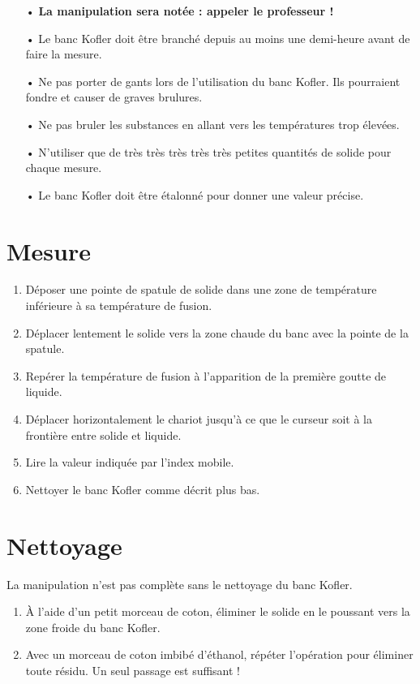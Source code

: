 \begin{itemize}
\item[•] \textbf{La manipulation sera notée : appeler le professeur !}
\item[•] Le banc Kofler doit être branché depuis au moins une demi-heure avant de faire la mesure.
\item[•] Ne pas porter de gants lors de l'utilisation du banc Kofler.
Ils pourraient fondre et causer de graves brulures.
\item[•] Ne pas \og bruler \fg{} les substances en allant vers les températures trop élevées.
\item[•] N'utiliser que de très \small très \footnotesize très \scriptsize très \tiny très \normalsize petites quantités de solide pour chaque mesure.
\item[•] Le banc Kofler doit être étalonné pour donner une valeur précise.
\end{itemize}

\section*{Mesure}

\begin{enumerate}
\item Déposer une pointe de spatule de solide dans une zone de température inférieure à sa température de fusion.
\item Déplacer lentement le solide vers la zone chaude du banc avec la pointe de la spatule.
\item Repérer la température de fusion à l'apparition de la première goutte de liquide.
\item Déplacer horizontalement le chariot jusqu'à ce que le curseur soit à la frontière entre solide et liquide.
\item Lire la valeur indiquée par l'index mobile.
\item Nettoyer le banc Kofler comme décrit plus bas.
\end{enumerate}

\section*{Nettoyage}

La manipulation n'est pas complète sans le nettoyage du banc Kofler.
\begin{enumerate}
\item À l'aide d'un petit morceau de coton, éliminer le solide en le poussant vers la zone froide du banc Kofler.
\item Avec un morceau de coton imbibé d'éthanol, répéter l'opération pour éliminer toute résidu.
Un seul passage est suffisant !
\end{enumerate}

